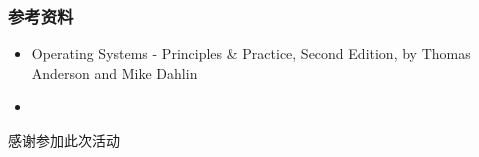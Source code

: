 \begin{frame}
	\frametitle{参考资料}
	\begin{itemize}
	\item Operating Systems - Principles \& Practice, Second Edition,
		by Thomas Anderson and Mike Dahlin
	\item {}
	\end{itemize}
\end{frame}

\PreLastFrame
\begin{frame}
	\centerline{\fontsize{32}{32}\selectfont 感谢参加此次活动}
\end{frame}

\newpage



